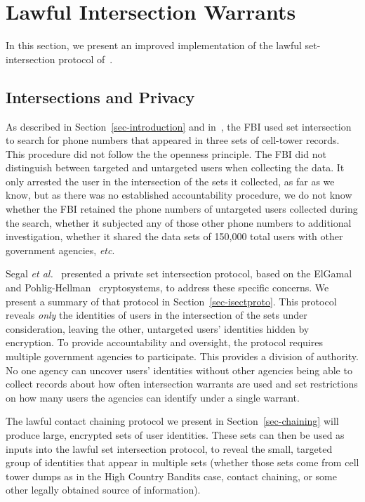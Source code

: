 \section{Lawful Intersection Warrants}\label{sec-intersection}
In this section, we present an improved implementation of the lawful
set-intersection protocol of~\cite{sff-foci2014}. 
\subsection{Intersections and Privacy}

As described in Section~\ref{sec-introduction} and in~\cite{sff-foci2014}, the FBI used
set intersection to search for phone numbers that appeared in three sets of
cell-tower records. This procedure did not follow the the openness principle.
The FBI did not distinguish between targeted and untargeted users when
collecting the data. It only arrested the user in the intersection of the sets
it collected, as far as we know, but as there was no established accountability
procedure, we do not know whether the FBI retained the phone numbers of
untargeted users collected during the search, whether it subjected any of those
other phone numbers to additional investigation, whether it shared the data sets
of 150,000 total users with other government agencies, \emph{etc}. 

Segal \emph{et al.}~\cite{sff-foci2014} presented a private set intersection
protocol, based on the ElGamal~\cite{elgamal} and Pohlig-Hellman~\cite{pohlighellman}
cryptosystems, to address these specific concerns. We present a summary of that protocol
in Section~\ref{sec-isectproto}. This protocol reveals \emph{only} the identities
of users in the intersection of the sets under consideration, leaving the other,
untargeted users' identities hidden by encryption. To provide accountability and
oversight, the protocol requires multiple government agencies to participate. This
provides a division of authority. No one agency can uncover users' identities
without other agencies being able to collect records about how often intersection
warrants are used and set restrictions on how many users the agencies can identify
under a single warrant.

The lawful contact chaining protocol we present in Section~\ref{sec-chaining} will
produce large, encrypted sets of user identities. These sets can then be used as
inputs into the lawful set intersection protocol, to reveal the small, targeted
group of identities that appear in multiple sets (whether those sets come from cell
tower dumps as in the High Country Bandits case, contact chaining, or some other
legally obtained source of information). 

